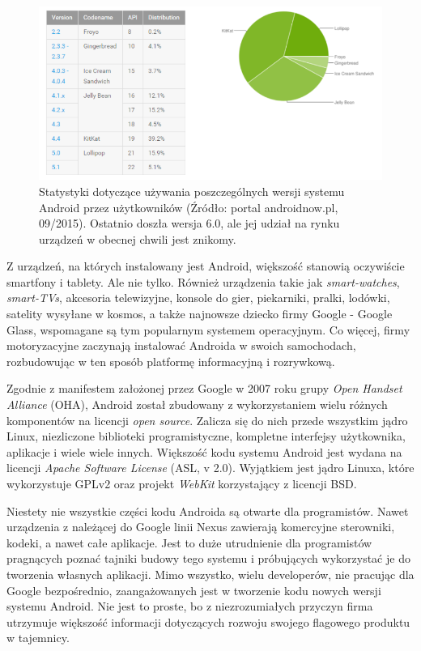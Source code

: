 \begin{figure}[!htb]
    \centering
    \includegraphics[width=17cm]{imgs/ch2_android_udzial_3.png}
    \caption
{Statystyki dotyczące używania poszczególnych wersji systemu Android przez użytkowników (Źródło: portal androidnow.pl, 09/2015). Ostatnio doszła wersja 6.0, ale jej udział na rynku urządzeń w obecnej chwili jest znikomy.}
    \label{fig:android_udzial_wersje}
\end{figure} 

Z urządzeń, na których instalowany jest Android, większość stanowią oczywiście smartfony i tablety. Ale nie tylko. Również urządzenia takie jak \textit{smart-watches}, \textit{smart-TVs}, akcesoria telewizyjne, konsole do gier, piekarniki, pralki, lodówki, satelity wysyłane w kosmos, a także najnowsze dziecko firmy Google - Google Glass, wspomagane są tym popularnym systemem operacyjnym. Co więcej, firmy motoryzacyjne zaczynają instalować Androida w swoich samochodach, rozbudowując w ten sposób platformę informacyjną i rozrywkową.

Zgodnie z manifestem założonej przez Google w 2007 roku grupy \textit{Open Handset Alliance} (OHA), Android został zbudowany z wykorzystaniem wielu różnych komponentów na licencji \textit{open source}. Zalicza się do nich przede wszystkim jądro Linux, niezliczone biblioteki programistyczne, kompletne interfejsy użytkownika, aplikacje i wiele wiele innych. Większość kodu systemu Android jest wydana na licencji \textit{Apache Software License} (ASL, v 2.0). Wyjątkiem jest jądro Linuxa, które wykorzystuje GPLv2 oraz projekt \textit{WebKit} korzystający z licencji BSD. 

Niestety nie wszystkie części kodu Androida są otwarte dla programistów. Nawet urządzenia z należącej do Google linii Nexus zawierają komercyjne sterowniki, kodeki, a nawet całe aplikacje. Jest to duże utrudnienie dla programistów pragnących poznać tajniki budowy tego systemu i próbujących wykorzystać je do tworzenia własnych aplikacji. Mimo wszystko, wielu developerów, nie pracując dla Google bezpośrednio, zaangażowanych jest w tworzenie kodu nowych wersji systemu Android. Nie jest to proste, bo z niezrozumiałych przyczyn firma utrzymuje większość informacji dotyczących rozwoju swojego flagowego produktu w tajemnicy.

